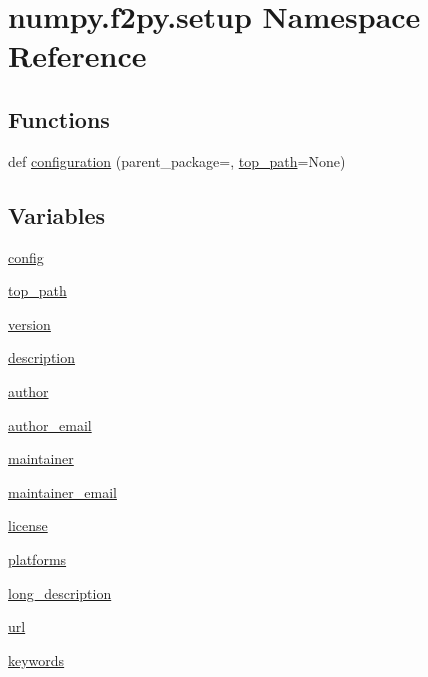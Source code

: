 \hypertarget{namespacenumpy_1_1f2py_1_1setup}{}\section{numpy.\+f2py.\+setup Namespace Reference}
\label{namespacenumpy_1_1f2py_1_1setup}
\subsection*{Functions}
\begin{DoxyCompactItemize}
\item 
def \hyperlink{namespacenumpy_1_1f2py_1_1setup_aaf8fa608c3836535fc5c99e9d7b4935a}{configuration} (parent\+\_\+package=\textquotesingle{}\textquotesingle{}, \hyperlink{namespacenumpy_1_1f2py_1_1setup_a977b3919065120de7c04cf82f56640cc}{top\+\_\+path}=None)
\end{DoxyCompactItemize}
\subsection*{Variables}
\begin{DoxyCompactItemize}
\item 
\hyperlink{namespacenumpy_1_1f2py_1_1setup_a4f390026f399442d657489f2867bfff8}{config}
\item 
\hyperlink{namespacenumpy_1_1f2py_1_1setup_a977b3919065120de7c04cf82f56640cc}{top\+\_\+path}
\item 
\hyperlink{namespacenumpy_1_1f2py_1_1setup_aaf02276ae180febaead1eed062cd1fa9}{version}
\item 
\hyperlink{namespacenumpy_1_1f2py_1_1setup_a36bf5d43549dec2d6c14851fe33fd10f}{description}
\item 
\hyperlink{namespacenumpy_1_1f2py_1_1setup_abbdc9e3b0eb7088442ea593d55275dac}{author}
\item 
\hyperlink{namespacenumpy_1_1f2py_1_1setup_a632cb36e88c7b830c6d675c49050f3ff}{author\+\_\+email}
\item 
\hyperlink{namespacenumpy_1_1f2py_1_1setup_a8610a0ec37b3071cbb0cbea6a67b51ee}{maintainer}
\item 
\hyperlink{namespacenumpy_1_1f2py_1_1setup_a8384dce7b705c49796b9d38d84462dc4}{maintainer\+\_\+email}
\item 
\hyperlink{namespacenumpy_1_1f2py_1_1setup_a2d9c1749faf47db240c5f0c768be4de7}{license}
\item 
\hyperlink{namespacenumpy_1_1f2py_1_1setup_a03e610203698c16a3690ff1226bf6b79}{platforms}
\item 
\hyperlink{namespacenumpy_1_1f2py_1_1setup_a10259bc7f7a05012722d6fc2c91b6ee5}{long\+\_\+description}
\item 
\hyperlink{namespacenumpy_1_1f2py_1_1setup_a0d2f72d5a28688c25ddd4885072e4fa9}{url}
\item 
\hyperlink{namespacenumpy_1_1f2py_1_1setup_af85c35946b31b95384d5f3fd188aed1e}{keywords}
\end{DoxyCompactItemize}


